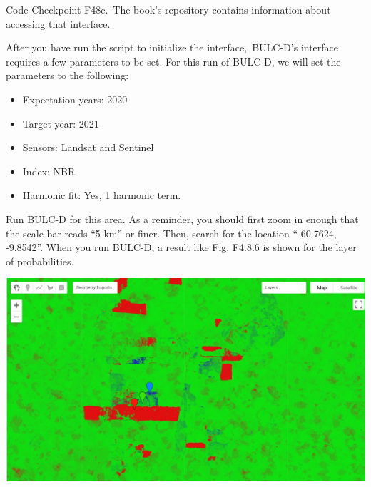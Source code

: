 \documentclass[
  letterpaper,
  DIV=11,
  numbers=noendperiod]{scrreprt}
\providecommand{\tightlist}{%
  \setlength{\itemsep}{0pt}\setlength{\parskip}{0pt}}\usepackage{longtable,booktabs,array}
\begin{document}
\begin{tcolorbox}[enhanced jigsaw, left=2mm, breakable, rightrule=.15mm, opacityback=0, colframe=quarto-callout-note-color-frame, colbacktitle=quarto-callout-note-color!10!white, arc=.35mm, opacitybacktitle=0.6, toptitle=1mm, colback=white, leftrule=.75mm, title=\textcolor{quarto-callout-note-color}{\faInfo}\hspace{0.5em}{Note}, toprule=.15mm, bottomtitle=1mm, titlerule=0mm, bottomrule=.15mm, coltitle=black]

Code Checkpoint F48c.~The book's repository contains information about
accessing that interface.

\end{tcolorbox}

After you have run the script to initialize the interface,~BULC-D's
interface requires a few parameters to be set. For this run of BULC-D,
we will set the parameters to the following:

\begin{itemize}
\tightlist
\item
  Expectation years: 2020
\item
  Target year: 2021
\item
  Sensors: Landsat and Sentinel
\item
  Index: NBR
\item
  Harmonic fit: Yes, 1 harmonic term.
\end{itemize}

Run BULC-D for this area. As a reminder, you should first zoom in enough
that the scale bar reads ``5 km'' or finer. Then, search for the
location ``-60.7624, -9.8542''. When you run BULC-D, a result like Fig.
F4.8.6 is shown for the layer of probabilities.

\includegraphics{./F4/image48.png}~
\end{document}
